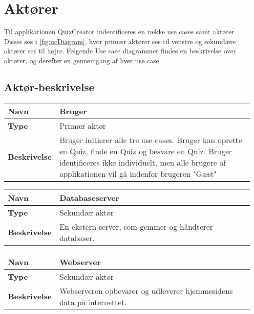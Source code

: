 \section{Aktører}

Til applikationen QuizCreator indentificeres en række use cases samt aktører. Disses ses i \ref{fig:ucDiagram}, hvor primær aktører ses til venstre og sekundære aktører ses til højre. Følgende Use case diagrammet findes en beskrivelse over aktører, og derefter en gennemgang af hver use case. 


\subsection{Aktør-beskrivelse}

\begin{tabular}{|p{2cm}|p{12cm}|}

\hline 
\textbf{Navn} & Bruger \\ 
\hline 
\textbf{Type} & Primær aktør \\ 
\hline 
\textbf{Beskrivelse} & Bruger initierer alle tre use cases. Bruger kan oprette en Quiz, finde en Quiz og besvare en Quiz. Bruger identificeres ikke individuelt, men alle brugere af applikationen vil gå indenfor brugeren "Gæst"\\ 
\hline 

\end{tabular} 

\begin{tabular}{|p{2cm}|p{12cm}|}

\hline 
\textbf{Navn} & Databaseserver \\ 
\hline 
\textbf{Type} & Sekundær aktør \\ 
\hline 
\textbf{Beskrivelse} & En ekstern server, som gemmer og håndterer databaser.\\ 
\hline 

\end{tabular} 

\begin{tabular}{|p{2cm}|p{12cm}|}

\hline 
\textbf{Navn} & Webserver \\ 
\hline 
\textbf{Type} & Sekundær aktør \\ 
\hline 
\textbf{Beskrivelse} & Webserveren opbevarer og udleverer hjemmesidens data på internettet.\\ 
\hline 

\end{tabular} 